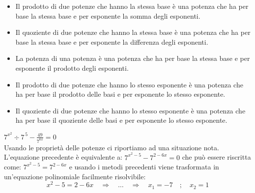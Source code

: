 \begin{itemize} %
 \item {}
 Il prodotto di due  potenze che hanno la stessa base è una potenza che ha per 
base la stessa base e per esponente la somma degli esponenti.
 \item {}
 Il quoziente di due  potenze che hanno la stessa base è una potenza che ha per 
base la stessa base e per esponente la differenza degli esponenti.
 \item {}
 La potenza di una potenza è una potenza che ha per base la stessa base e per 
esponente il prodotto degli esponenti.
 \item {}
 Il prodotto di due  potenze che hanno lo stesso esponente è una potenza che ha 
per base il prodotto delle basi e per esponente lo stesso esponente.
 \item {}
 Il quoziente di due  potenze che hanno lo stesso esponente è una potenza che 
ha per base il quoziente delle basi e per esponente lo stesso esponente.
\end{itemize}

\begin{esempio}\(7^{x^2} \div 7^{\,5} - \frac{49}{7^{6x}} = 0\)\\[4pt] Usando le proprietà delle potenze 
ci riportiamo ad una situazione nota. 
L'equazione precedente è equivalente a: 
\(7^{x^2-5} - 7^{2-6x} = 0\) che può essere riscritta come:
\(7^{x^2-5} = 7^{2-6x}\) e usando i metodi precedenti viene 
trasformata in un'equazione polinomiale facilmente risolvibile:
\[x^2-5 = 2-6x \quad\Rightarrow\quad \dots\quad \Rightarrow \quad x_1=-7 \quad;\quad  x_2=1\]
\end{esempio}

